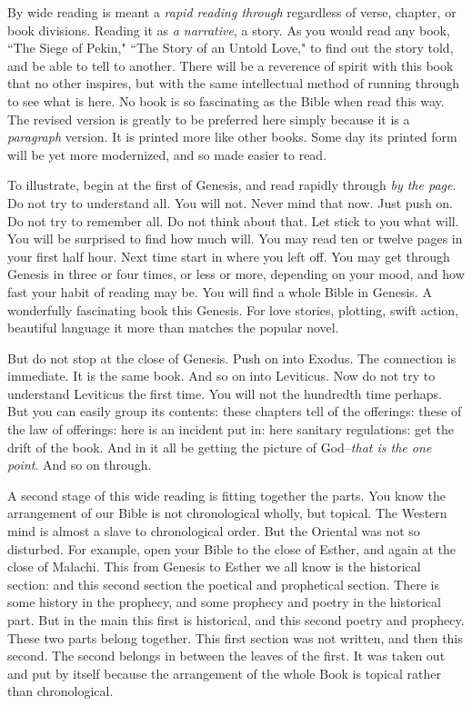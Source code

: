By wide reading is meant a \textit{rapid reading through} regardless of verse,
chapter, or book divisions. Reading it as \textit{a narrative}, a story. As you
would read any book, ``The Siege of Pekin," ``The Story of an Untold Love,"
to find out the story told, and be able to tell to another. There will be
a reverence of spirit with this book that no other inspires, but with the
same intellectual method of running through to see what is here. No book
is so fascinating as the Bible when read this way. The revised version is
greatly to be preferred here simply because it is a \textit{paragraph} version.
It is printed more like other books. Some day its printed form will be yet
more modernized, and so made easier to read.

To illustrate, begin at the first of Genesis, and read rapidly through \textit{by
the page}. Do not try to understand all. You will not. Never mind that
now. Just push on. Do not try to remember all. Do not think about that.
Let stick to you what will. You will be surprised to find how much will.
You may read ten or twelve pages in your first half hour. Next time start
in where you left off. You may get through Genesis in three or four times,
or less or more, depending on your mood, and how fast your habit of
reading may be. You will find a whole Bible in Genesis. A wonderfully
fascinating book this Genesis. For love stories, plotting, swift action,
beautiful language it more than matches the popular novel.

But do not stop at the close of Genesis. Push on into Exodus. The
connection is immediate. It is the same book. And so on into Leviticus.
Now do not try to understand Leviticus the first time. You will not the
hundredth time perhaps. But you can easily group its contents: these
chapters tell of the offerings: these of the law of offerings: here is an
incident put in: here sanitary regulations: get the drift of the book. And
in it all be getting the picture of God--\textit{that is the one point}. And so
on through.

A second stage of this wide reading is fitting together the parts. You
know the arrangement of our Bible is not chronological wholly, but
topical. The Western mind is almost a slave to chronological order. But
the Oriental was not so disturbed. For example, open your Bible to the
close of Esther, and again at the close of Malachi. This from Genesis to
Esther we all know is the historical section: and this second section the
poetical and prophetical section. There is some history in the prophecy,
and some prophecy and poetry in the historical part. But in the main this
first is historical, and this second poetry and prophecy. These two parts
belong together. This first section was not written, and then this second.
The second belongs in between the leaves of the first. It was taken out
and put by itself because the arrangement of the whole Book is topical
rather than chronological.

